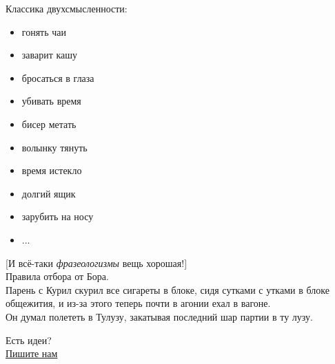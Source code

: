 \documentclass{ideas}
\begin{document}
Классика двухсмысленности:
\begin{itemize}
    \item гонять чаи\\
    \item заварит кашу\\
    \item бросаться в глаза\\
    \item убивать время\\
    \item бисер метать\\
    \item волынку тянуть\\
    \item время истекло\\
    \item долгий ящик\\
    \item зарубить на носу\\
    \item ...\\
\end{itemize}

[И всё-таки \emph{фразеологизмы} вещь хорошая!]\\


Правила отбора от Бора.\\


Парень с Курил скурил все сигареты в блоке, сидя сутками с утками 
в блоке общежития, и из-за этого теперь почти в агонии ехал в 
вагоне.\\


Он думал полететь в Тулузу, закатывая последний шар партии в ту 
лузу.\\
\newpage
\begin{center}
{\large Есть идеи?\\
\href{anto-kha0@rambler.ru}%
{Пишите нам}}
\end{center}
\end{document}
